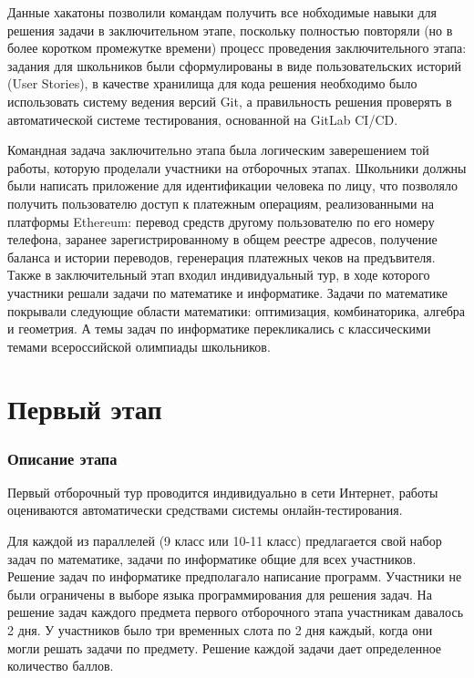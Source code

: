 \documentclass[a4paper,12pt,oneside]{book}
\begin{document}
Данные хакатоны позволили командам получить все нобходимые навыки для
решения задачи в заключительном этапе, поскольку полностью повторяли
(но в более коротком промежутке времени) процесс проведения
заключительного этапа: задания для школьников были сформулированы в
виде пользовательских историй (User Stories), в качестве хранилища
для кода решения необходимо было использовать систему ведения версий
Git, а правильность решения проверять в автоматической системе
тестирования, основанной на GitLab CI/CD.

Командная задача заключительно этапа была логическим заверешением той
работы, которую проделали участники на отборочных этапах. Школьники
должны были написать приложение для идентификации человека по лицу,
что позволяло получить пользователю доступ к платежным операциям,
реализованными на платформы Ethereum: перевод средств другому
пользователю по его номеру телефона, заранее зарегистрированному в
общем реестре адресов, получение баланса и истории переводов,
геренерация платежных чеков на предъвителя. Также в заключительный
этап входил индивидуальный тур, в ходе которого участники решали
задачи по математике и информатике. Задачи по математике покрывали
следующие области математики: оптимизация, комбинаторика, алгебра и
геометрия. А темы задач по информатике перекликались с классическими
темами всероссийской олимпиады школьников.

\part{Первый этап}

\newpage

\section*{Описание этапа}

Первый отборочный тур проводится индивидуально в сети Интернет, работы оцениваются автоматически средствами системы онлайн-тестирования.

Для каждой из параллелей (9 класс или 10-11 класс) предлагается свой набор задач по математике, задачи по информатике общие для всех участников. Решение задач по информатике предполагало написание программ. Участники не были ограничены в выборе языка программирования для решения задач. На решение задач каждого предмета первого отборочного этапа участникам давалось 2 дня. У участников было три временных слота по 2 дня каждый, когда они могли решать задачи по предмету. Решение каждой задачи дает определенное количество баллов.
\end{document}
